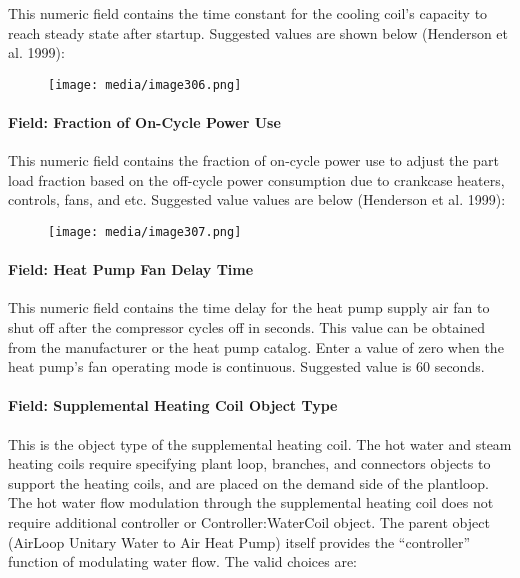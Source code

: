 This numeric field contains the time constant for the cooling coil's capacity to reach steady state after startup. Suggested values are shown below (Henderson et al. 1999):

\begin{figure}[htbp]
\centering
\texttt{[image: media/image306.png]}
\caption{}
\end{figure}

\paragraph{Field: Fraction of On-Cycle Power Use}\label{field-fraction-of-on-cycle-power-use-1}

This numeric field contains the fraction of on-cycle power use to adjust the part load fraction based on the off-cycle power consumption due to crankcase heaters, controls, fans, and etc. Suggested value values are below (Henderson et al. 1999):

\begin{figure}[htbp]
\centering
\texttt{[image: media/image307.png]}
\caption{}
\end{figure}

\paragraph{Field: Heat Pump Fan Delay Time}\label{field-heat-pump-fan-delay-time-1}

This numeric field contains the time delay for the heat pump supply air fan to shut off after the compressor cycles off in seconds. This value can be obtained from the manufacturer or the heat pump catalog. Enter a value of zero when the heat pump's fan operating mode is continuous. Suggested value is 60 seconds.

\paragraph{Field: Supplemental Heating Coil Object Type}\label{field-supplemental-heating-coil-object-type-3}

This is the object type of the supplemental heating coil. The hot water and steam heating coils require specifying plant loop, branches, and connectors objects to support the heating coils, and are placed on the demand side of the plantloop. The hot water flow modulation through the supplemental heating coil does not require additional controller or Controller:WaterCoil object. The parent object (AirLoop Unitary Water to Air Heat Pump) itself provides the ``controller'' function of modulating water flow. The valid choices are:

